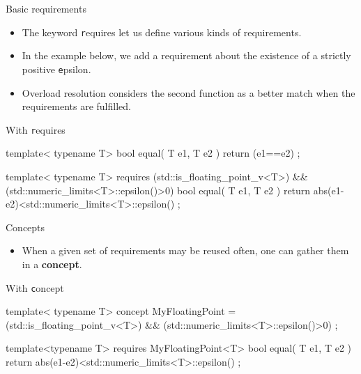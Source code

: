 \begin{frame}[fragile]
    \begin{block}{Basic requirements}
      \begin{itemize}
        \item The keyword {\texttt requires} let us define various kinds of requirements.
        \item In the example below, we add a requirement about the existence of a strictly positive {\texttt epsilon}.
        \item Overload resolution considers the second function as a better match when the requirements are fulfilled.
      \end{itemize}
    \end{block}
    \begin{exampleblock}{With {\texttt requires}}
      \scriptsize
      \begin{cppcode*}{}
      template< typename T>
      bool equal( T e1, T e2 )
      { return (e1==e2) ; }

      template< typename T>
      requires (std::is_floating_point_v<T>)
            && (std::numeric_limits<T>::epsilon()>0)
      bool equal( T e1, T e2 )
      { return abs(e1-e2)<std::numeric_limits<T>::epsilon() ; }
      \end{cppcode*}
    \end{exampleblock}
\end{frame}

\begin{frame}[fragile]
    \begin{block}{Concepts}
      \begin{itemize}
        \item When a given set of requirements may be reused often, one can gather them in a \textbf{concept}.
      \end{itemize}
    \end{block}
    \begin{exampleblock}{With {\texttt concept}}
      \scriptsize
      \begin{cppcode*}{}
      template< typename T>
      concept MyFloatingPoint =
        (std::is_floating_point_v<T>) &&
        (std::numeric_limits<T>::epsilon()>0) ;

      template<typename T>
      requires MyFloatingPoint<T>
      bool equal( T e1, T e2 )
      { return abs(e1-e2)<std::numeric_limits<T>::epsilon() ; }
      \end{cppcode*}
    \end{exampleblock}
\end{frame}

